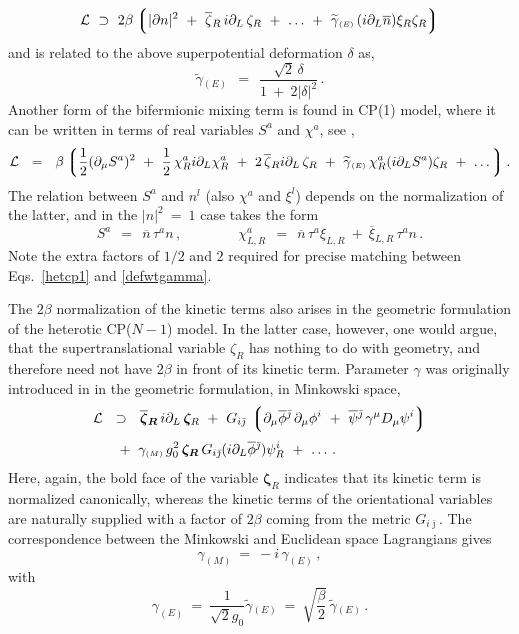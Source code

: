 \documentclass[epsfig,12pt]{article}
\def\beq{\begin{equation}}
\def\eeq{\end{equation}}
\def\beq{\begin{equation}}
\def\eeq{\end{equation}}
\newcommand{\p}{\partial}
\newcommand{\wt}{\widetilde}
\newcommand{\ov}{\overline}
\newcommand{\mc}[1]{\mathcal{#1}}
\newcommand{\lgr}{\left\lgroup}
\newcommand{\rgr}{\right\rgroup}
\newcommand{\xir}{\xi_R}
\newcommand{\bzr}{\ov{\zeta}{}_R}
\newcommand{\zr}{\zeta_R}
\newcommand{\nbar}{\ov{n}}
\newcommand{\bpsi}{\ov{\psi}{}}
\newcommand{\bphi}{\ov{\phi}{}}
\newcommand{\bxi}{\ov{\xi}{}}
\newcommand{\bj}{{\bar \jmath}}
\newcommand{\ssm}{{\scriptscriptstyle(M)}}
\newcommand{\sse}{{\scriptscriptstyle(E)}}
\begin{document}
{\beq
\label{defwtgamma}
	\mc{L}  ~\supset~  2\beta \lgr |\p n|^2 ~+~ \bzr\, i\p_L\, \zr ~+~ \dots 
				~+~ \wt{\gamma}{}_\sse\, (i\p_L \nbar) \xir \zr \rgr 
\eeq
and is related to the above superpotential deformation $ \delta $ as,
\beq
\label{gammadelta}
	\wt{\gamma}{}_\sse  ~~=~~  \frac{\sqrt{2}\,\delta}{ 1 ~+~ 2 |\delta|^2 }\,.
\eeq
Another form of the bifermionic mixing term is found in CP(1) model, where it can be written in
terms of real variables $ S^a $ and $ \chi^a $, see \cite{SY1},
\beq
\label{hetcp1}
	\mc{L} ~~=~~ \beta \lgr
			\frac{1}{2} (\p_\mu S^a)^2 ~+~ \frac{1}{2}\,\chi_R^a i\p_L \chi_R^a 
				     ~+~ 2\, \bzr i\p_L\, \zr  
				     ~+~ \wt{\gamma}{}_\sse\, \chi_R^a (i\p_L S^a) \zr ~+~ \dots \rgr.
\eeq
The relation between $ S^a $ and $ n^l $ (also $ \chi^a $ and $ \xi^l $) depends on the 
normalization of the latter, and in the $ | n |^2  ~=~ 1 $ case takes the form
\beq
	S^a  ~~=~~ \nbar\, \tau^a n\,,  \qquad\qquad  
	\chi^a_{L,R} ~~=~~ \nbar\,\tau^a \xi_{L,R} ~+~ \bxi_{L,R}\, \tau^a n\,.
\eeq
Note the extra factors of $1/2$ and $2$ required for precise matching 
between Eqs.~\eqref{hetcp1} and \eqref{defwtgamma}.

The $ 2\beta $ normalization of the kinetic terms also arises in the geometric formulation 
of the heterotic CP($N-1$) model.
In the latter case, however, one would argue, that the supertranslational variable $ \zr $ has
nothing to do with geometry, and therefore need not have $ 2\beta $ in front of its kinetic term.
Parameter $\gamma$ was originally introduced in \cite{SY1} in the geometric formulation,
in Minkowski space,
\begin{align}
%
\notag
	\mc{L} & ~~\supset~~ \bm{\bzr}\, i\p_L\, \bm\zr ~+~
				G_{i\bj}\, \lgr \p_\mu \bphi^\bj\, \p_\mu \phi^i   ~+~
						\bpsi^\bj\, \gamma^\mu D_\mu \psi^i \rgr \\[1mm]
%
		& ~~~+~ \gamma_\ssm\,g_0^2\, \boldsymbol{\zr}\, G_{i\bj} (i \p_L \bphi^\bj)\psi_R^i 
		~+~ \dots\,.
\end{align}
Here, again, the bold face of the variable $ \bm\zr $ indicates that its kinetic term is 
normalized canonically, whereas the kinetic terms of the orientational variables are naturally 
supplied with a factor of $ 2\beta $ coming from the metric $ G_{i\bj} $.
The correspondence between the Minkowski and Euclidean space Lagrangians gives
\beq
\label{app:gammamink}
	\gamma_\ssm  ~=~  -i\, \gamma_\sse\,,
\eeq
with
\beq
         \gamma_\sse ~=~ \frac{1}{\sqrt{2}g_0} \wt\gamma{}_\sse 
		      ~=~ \sqrt{\frac{\beta}{2}}\, \wt\gamma{}_\sse\,.
\eeq

}
\end{document}
